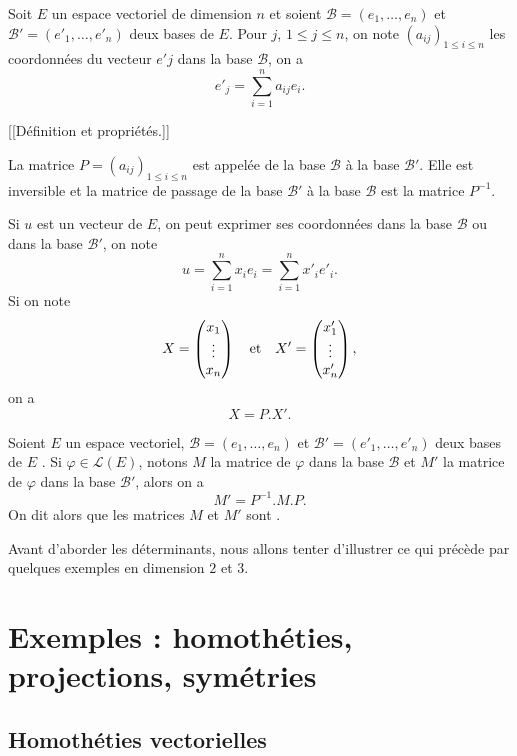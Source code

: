 \documentclass[class=report,crop=false]{standalone}
\begin{document}
Soit $E$ un espace vectoriel de dimension $n$ et soient 
$\mathcal{B}=(e_1,\dots,e_n)$ et $\mathcal{B}'=(e'_1,\dots,e'_n)$ 
deux bases de $E$. Pour $j$, $1\leq j\leq n$, on note $(a_{ij})_{1\leq i\leq n}$ 
les coordonnées du vecteur $e'j$ dans la base $\mathcal{B}$, on a
$$e'_j=\sum_{i=1}^n a_{ij}e_i.$$

[[Définition et propriétés.]]
 
\begin{proposition}
La matrice $P=(a_{ij})_{1\leq i\leq n}$ est appelée 
 de la base $\mathcal{B}$ à la base $\mathcal{B}'$. 
Elle est inversible et la matrice de passage de la base $\mathcal{B}'$ 
à la base $\mathcal{B}$  est la matrice $P^{-1}$.
\end{proposition}

 
Si $u$ est un vecteur de $E$, on peut exprimer ses coordonnées dans la base $\mathcal{B}$ ou dans la base $\mathcal{B}'$, on note 
$$u=\sum_{i=1}^n x_ie_i=\sum_{i=1}^n x'_ie'_i.$$
Si on note 
$$X=\left(\begin{matrix}x_1\cr\vdots\cr x_n\end{matrix}\right)\quad {\hbox{et}}\quad X'=\left(\begin{matrix}x'_1\cr\vdots\cr x'_n\end{matrix}\right),$$
on a 
$$X=P.X'.$$

\begin{proposition}
Soient $E$ un espace vectoriel, $\mathcal{B}=(e_1,\dots,e_n)$ et 
$\mathcal{B}'=(e'_1,\dots,e'_n)$ deux bases de $E$ . Si $\varphi\in\mathcal{L}(E)$, 
notons $M$ la matrice de $\varphi$ dans la base $\mathcal{B}$ et $M'$ la matrice de 
$\varphi$ dans la base $\mathcal{B}'$, alors on a
$$M'=P^{-1}.M.P.$$
On dit alors que les matrices $M$ et $M'$ sont .
\end{proposition}   



Avant d'aborder les déterminants, nous allons tenter d'illustrer ce qui 
précède par quelques exemples en dimension $2$ et $3$.


\section{Exemples : homothéties, projections, symétries}

\subsection{Homothéties vectorielles}
\end{document}
